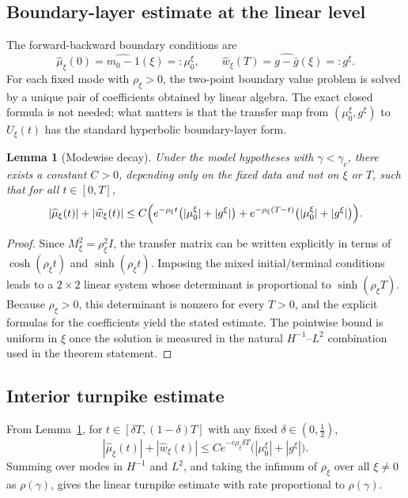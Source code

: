 \documentclass[11pt]{amsart}
\newtheorem{lemma}[theorem]{Lemma}
\theoremstyle{definition}
\theoremstyle{remark}
\newcommand{\gamc}{\gamma_c}
\begin{document}
\subsection{Boundary-layer estimate at the linear level}
\label{sub:boundary-layer}

The forward-backward boundary conditions are
\[
\widehat\mu_\xi(0)=\widehat{m_0-1}(\xi)=:\mu_0^\xi,
\qquad
\widehat w_\xi(T)=\widehat{g-\bar g}(\xi)=:g^\xi.
\]
For each fixed mode with $\rho_\xi>0$, the two-point boundary value problem is solved by a unique pair of coefficients obtained by linear algebra. The exact closed formula is not needed; what matters is that the transfer map from $(\mu_0^\xi,g^\xi)$ to $U_\xi(t)$ has the standard hyperbolic boundary-layer form.

\begin{lemma}[Modewise decay]
\label{lem:coeff}
Under the model hypotheses with $\gamma<\gamc$, there exists a constant
$C>0$, depending only on the fixed data and not on $\xi$ or $T$, such that for all $t\in[0,T]$,
\[
|\widehat\mu_\xi(t)|+|\widehat w_\xi(t)|
\le
C\Bigl(
e^{-\rho_\xi t}\bigl(|\mu_0^\xi|+|g^\xi|\bigr)
+
e^{-\rho_\xi(T-t)}\bigl(|\mu_0^\xi|+|g^\xi|\bigr)
\Bigr).
\]
\end{lemma}

\begin{proof}
Since $M_\xi^2=\rho_\xi^2I$, the transfer matrix can be written explicitly in terms of $\cosh(\rho_\xi t)$ and $\sinh(\rho_\xi t)$. Imposing the mixed initial/terminal conditions leads to a $2\times 2$ linear system whose determinant is proportional to $\sinh(\rho_\xi T)$. Because $\rho_\xi>0$, this determinant is nonzero for every $T>0$, and the explicit formulas for the coefficients yield the stated estimate. The pointwise bound is uniform in $\xi$ once the solution is measured in the natural $H^{-1}$--$L^2$ combination used in the theorem statement.
\end{proof}

\subsection{Interior turnpike estimate}
\label{sub:interior}

From Lemma~\ref{lem:coeff}, for $t\in[\delta T,(1-\delta)T]$ with any fixed $\delta\in(0,\frac12)$,
\[
|\widehat\mu_\xi(t)|+|\widehat w_\xi(t)|
\le
C e^{-c\rho_\xi\delta T}\bigl(|\mu_0^\xi|+|g^\xi|\bigr).
\]
Summing over modes in $H^{-1}$ and $L^2$, and taking the infimum of $\rho_\xi$ over all $\xi\neq 0$ as $\rho(\gamma)$, gives the linear turnpike estimate with rate proportional to $\rho(\gamma)$.
\end{document}
